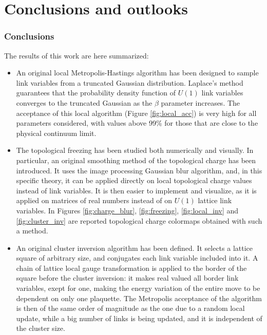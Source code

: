 \chapter{Conclusions and outlooks}\label{ch:conclusion}
\subsection*{Conclusions}
The results of this work are here summarized:
\begin{itemize}
    \item
        An original local Metropolis-Hastings algorithm has been designed to sample link variables from a truncated Gaussian distribution.
        Laplace's method guarantees that the probability density function of $U(1)$ link variables converges to the truncated Gaussian
        as the $\beta$ parameter increases.
        The acceptance of this local algorithm (Figure \ref{fig:local_acc}) is very high for all parameters considered,
        with values above 99\% for those that are close to the physical continuum limit.
    \item
        The topological freezing has been studied both numerically and visually.
        In particular, an original smoothing method of the topological charge has been introduced.
        It uses the image processing Gaussian blur algorithm, and, in this specific theory,
        it can be applied directly on local topological charge values instead of link variables.
        It is then easier to implement and visualize,
        as it is applied on matrices of real numbers instead of on $U(1)$ lattice link variables.
        In Figures \ref{fig:charge_blur}, \ref{fig:freezing}, \ref{fig:local_inv} and \ref{fig:cluster_inv}
        are reported topological charge colormaps obtained with such a method.
    \item
        An original cluster inversion algorithm has been defined.
        It selects a lattice square of arbitrary size, and conjugates each link variable included into it.
        A chain of lattice local gauge transformation is applied to the border of the square before the cluster inversion:
        it makes real valued all border link variables, exept for one, making the energy variation of the entire move to be
        dependent on only one plaquette.
        The Metropolis acceptance of the algorithm is then of the same order of magnitude as the one due to a random local update,
        while a big number of links is being updated, and it is independent of the cluster size.

\end{itemize}
